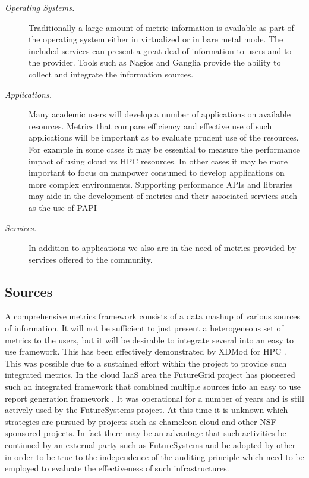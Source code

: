 \documentclass{sig-alternate-05-2015}
\begin{document}
\begin{description}
\item[\it Operating Systems.] Traditionally a large amount of metric information is available as part of the operating system either in virtualized or in bare metal mode. The included services can present a great deal of information to users and to the provider. Tools such as Nagios and Ganglia provide the ability to collect and integrate the information sources.

\item[\it Applications.] Many academic users will develop a number of applications on available resources. Metrics that compare efficiency and effective use of such applications will be important as to evaluate prudent use of the resources. For example in some cases it may be essential to measure the performance impact of using cloud vs HPC resources. In other cases it may be more important to focus on manpower consumed to develop applications on more complex environments. Supporting performance APIs and libraries may aide in the development of metrics and their associated services such as the use of PAPI \cite{papi2014,papi-web,JohnNelsonAnalyzingPAPI}

\item[\it Services.] In addition to applications we also are in the need of metrics provided by services offered to the community.

\end{description}

\subsection{Sources}

A comprehensive metrics framework consists of a data mashup of various sources of information. It will not be sufficient to just present a heterogeneous set of metrics to the users, but it will be desirable to integrate several into an easy to use framework. This has been effectively demonstrated by XDMod for HPC \cite{las14cloudmeshmultiple,las14Impact,las12xdmod-kernel}. This was possible due to a sustained effort within the project to provide such integrated metrics. In the cloud IaaS area the FutureGrid project has pioneered such an integrated framework that combined multiple sources into an easy to use report generation framework \cite{LeeFGresource}. It was operational for a number of years and is still actively used by the FutureSystems project. At this time it is unknown which strategies are pursued by projects such as chameleon cloud and other NSF sponsored projects.  In fact there may be an advantage that such activities be continued by an external party such as FutureSystems and be adopted by other in order to be true to the independence of the auditing principle which need to be employed to evaluate the effectiveness of such infrastructures.
\end{document}
